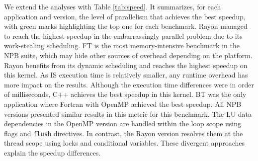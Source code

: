     We extend the analyses with Table \ref{tab:speed}. It summarizes, for each application and version, the level of parallelism that achieves the best speedup, with green marks highlighting the top one for each benchmark. Rayon managed to reach the highest speedup in the embarrassingly parallel problem due to its work-stealing scheduling. FT is the most memory-intensive benchmark in the NPB suite, which may hide other sources of overhead depending on the platform. Rayon benefits from its dynamic scheduling and reaches the highest speedup on this kernel. As IS execution time is relatively smaller, any runtime overhead has more impact on the results. Although the execution time differences were in order of milliseconds, C++ achieves the best speedup in this kernel. BT was the only application where Fortran with OpenMP achieved the best speedup. All NPB versions presented similar results in this metric for this benchmark. The LU data dependencies in the OpenMP version are handled within the loop scope using flags and \texttt{flush} directives. In contrast, the Rayon version resolves them at the thread scope using locks and conditional variables. These divergent approaches explain the speedup differences.



        



